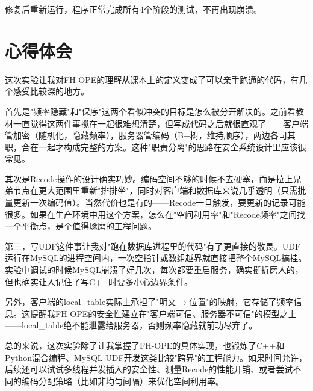 \documentclass[a4paper]{article}
\begin{document}
修复后重新运行，程序正常完成所有4个阶段的测试，不再出现崩溃。

\section{心得体会}

这次实验让我对FH-OPE的理解从课本上的定义变成了可以亲手跑通的代码，有几个感受比较深的地方。

首先是"频率隐藏"和"保序"这两个看似冲突的目标是怎么被分开解决的。之前看教材一直觉得这两件事搅在一起很难想清楚，但写成代码之后就很直观了——客户端管加密（随机化，隐藏频率），服务器管编码（B+树，维持顺序），两边各司其职，合在一起才构成完整的方案。这种"职责分离"的思路在安全系统设计里应该很常见。

其次是Recode操作的设计确实巧妙。编码空间不够的时候不去硬塞，而是拉上兄弟节点在更大范围里重新"排排坐"，同时对客户端和数据库来说几乎透明（只需批量更新一次编码值）。当然代价也是有的——Recode一旦触发，要更新的记录可能很多。如果在生产环境中用这个方案，怎么在"空间利用率"和"Recode频率"之间找一个平衡点，是个值得琢磨的工程问题。

第三，写UDF这件事让我对"跑在数据库进程里的代码"有了更直接的敬畏。UDF运行在MySQL的进程空间内，一次空指针或数组越界就直接把整个MySQL搞挂。实验中调试的时候MySQL崩溃了好几次，每次都要重启服务，确实挺折磨人的，但也确实让人记住了写C++时要多小心边界条件。

另外，客户端的local\_table实际上承担了"明文$\rightarrow$位置"的映射，它存储了频率信息。这提醒我FH-OPE的安全性建立在"客户端可信、服务器不可信"的模型之上——local\_table绝不能泄露给服务器，否则频率隐藏就前功尽弃了。

总的来说，这次实验除了让我掌握了FH-OPE的具体实现，也锻炼了C++和Python混合编程、MySQL UDF开发这类比较"跨界"的工程能力。如果时间允许，后续还可以试试多线程并发插入的安全性、测量Recode的性能开销、或者尝试不同的编码分配策略（比如非均匀间隔）来优化空间利用率。
\end{document}
